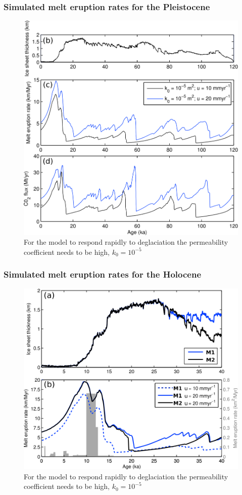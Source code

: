 \documentclass[aspectratio=169]{beamer}
\begin{document}
\begin{frame}
    \frametitle{Simulated melt eruption rates for the Pleistocene}
    \begin{figure}
        \includegraphics[height=0.7\paperheight]{./figures/iceland-model1.png}
        \caption{For the model to respond rapidly to deglaciation the permeability coefficient needs to be high, $k_{0}=10^{-5}$}
    \end{figure}
\end{frame}

\begin{frame}
    \frametitle{Simulated melt eruption rates for the Holocene}
    \begin{figure}
        \includegraphics[height=0.7\paperheight]{./figures/iceland-model2.png}
        \caption{For the model to respond rapidly to deglaciation the permeability coefficient needs to be high, $k_{0}=10^{-5}$}
    \end{figure}
\end{frame}
\end{document}
